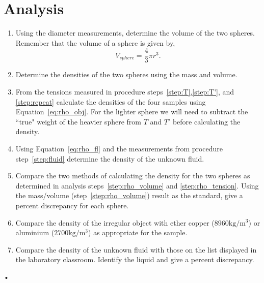 \documentclass[main.tex]{subfiles}
\begin{document}
\section*{Analysis}
\begin{enumerate}
\item
Using the diameter measurements, determine the volume of the two spheres. Remember that the volume of a sphere is given by,
\[
V_{sphere}=\frac{4}{3}\pi r^3.
\]
\item \label{step:rho_volume}
Determine the densities of the two spheres using the mass and volume.
\item \label{step:rho_tension}
From the tensions measured in procedure steps~\ref{step:T},\ref{step:T'}, and \ref{step:repeat} calculate the densities of the four samples using Equation~\eqref{eq:rho_obj}. For the lighter sphere we will need to subtract the ``true" weight of the heavier sphere from $T$ and $T'$ before calculating the density.
\item
Using Equation~\eqref{eq:rho_fl} and the measurements from procedure step~\ref{step:fluid} determine the density of the unknown fluid.
\item
Compare the two methods of calculating the density for the two spheres as determined in analysis steps~\ref{step:rho_volume} and \ref{step:rho_tension}. Using the mass/volume (step~\ref{step:rho_volume}) result as the standard, give a percent discrepancy for each sphere.
\item
Compare the density of the irregular object with ether copper ($8960 \text{kg}/\text{m}^3$) or aluminium ($2700 \text{kg}/\text{m}^3$) as appropriate for the sample.
\item
Compare the density of the unknown fluid with those on the list displayed in the laboratory classroom. Identify the liquid and give a percent discrepancy.
\end{enumerate}•
\end{document}
